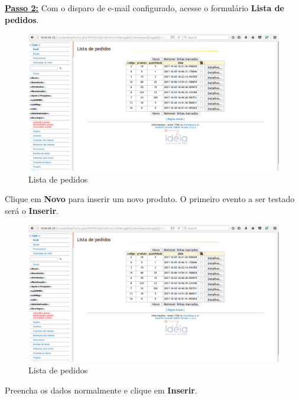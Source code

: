 \documentclass[9pt]{report}
\begin{document}
{      \underline{\textbf{Passo 2:}} Com o disparo de e-mail configurado, acesse o formulário \textbf{Lista de pedidos}.
      
      \begin{figure}[H]
        \includegraphics[width=\textwidth]{2_Formularios/6_Envio_de_email/65.png}
        \caption{Lista de pedidos}
        \label{fig:novopedidoemail}
      \end{figure}

      Clique em \textbf{Novo} para inserir um novo produto. O
      primeiro evento a ser testado será o \textbf{Inserir}.

      \begin{figure}[H]
        \includegraphics[width=\textwidth]{2_Formularios/6_Envio_de_email/65.png}
        \caption{Lista de pedidos}
        \label{fig:novopedidoemail}
      \end{figure}

      Preencha os dados normalmente e clique em \textbf{Inserir}.

}
\end{document}
